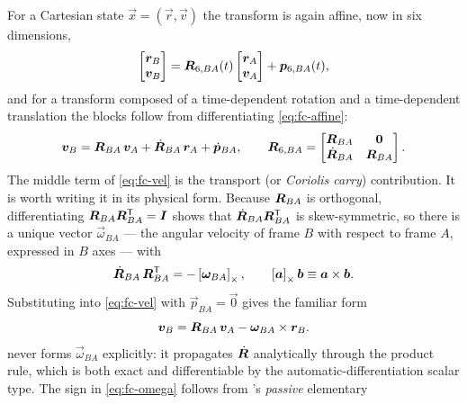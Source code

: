 For a Cartesian state $\vec{x} = (\vec{r}, \vec{v})$ the transform is again
affine, now in six dimensions,
%
\begin{equation}
  \label{eq:fc-affine6}
  \begin{bmatrix}\bm{r}_B \\ \bm{v}_B\end{bmatrix}
  =
  \bm{R}_{6,BA}(t)
  \begin{bmatrix}\bm{r}_A \\ \bm{v}_A\end{bmatrix}
  + \bm{p}_{6,BA}(t),
\end{equation}
%
and for a transform composed of a time-dependent rotation and a
time-dependent translation the blocks follow from differentiating
\cref{eq:fc-affine}:
%
\begin{equation}
  \label{eq:fc-vel}
  \bm{v}_B
  = \bm{R}_{BA}\,\bm{v}_A
  + \dot{\bm{R}}_{BA}\,\bm{r}_A
  + \dot{\bm{p}}_{BA},
  \qquad
  \bm{R}_{6,BA}
  = \begin{bmatrix}
      \bm{R}_{BA} & \bm{0} \\
      \dot{\bm{R}}_{BA} & \bm{R}_{BA}
    \end{bmatrix}.
\end{equation}
%
The middle term of \cref{eq:fc-vel} is the transport (or \emph{Coriolis
carry}) contribution. It is worth writing it in its physical form. Because
$\bm{R}_{BA}$ is orthogonal, differentiating
$\bm{R}_{BA}\bm{R}_{BA}^{\mathsf{T}} = \bm{I}$ shows that
$\dot{\bm{R}}_{BA}\bm{R}_{BA}^{\mathsf{T}}$ is skew-symmetric, so there is a
unique vector $\vec{\omega}_{BA}$ --- the angular velocity of frame $B$ with
respect to frame $A$, expressed in $B$ axes --- with
%
\begin{equation}
  \label{eq:fc-omega}
  \dot{\bm{R}}_{BA}\,\bm{R}_{BA}^{\mathsf{T}} = -\left[\bm{\omega}_{BA}\right]_\times,
  \qquad
  \left[\bm{a}\right]_\times \bm{b} \equiv \bm{a}\times\bm{b}.
\end{equation}
%
Substituting into \cref{eq:fc-vel} with $\vec{p}_{BA}=\vec{0}$ gives the
familiar form
%
\begin{equation}
  \label{eq:fc-transport}
  \bm{v}_B
  = \bm{R}_{BA}\,\bm{v}_A - \bm{\omega}_{BA}\times\bm{r}_B .
\end{equation}
%
\lupnt{} never forms $\vec{\omega}_{BA}$ explicitly: it propagates
$\dot{\bm{R}}$ analytically through the product rule, which is both exact
and differentiable by the automatic-differentiation scalar type. The sign in
\cref{eq:fc-omega} follows from \lupnt{}'s \emph{passive} elementary

